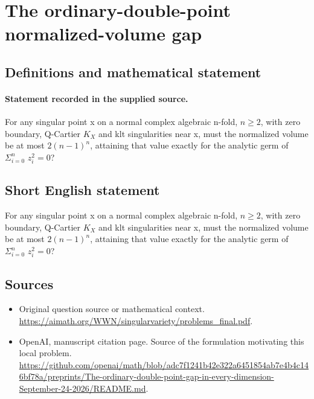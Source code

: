 \documentclass[11pt]{article}
\begin{document}
\section*{The ordinary-double-point normalized-volume gap}\label{statement}
\subsection{Definitions and mathematical statement}
\paragraph{Statement recorded in the supplied source.}
For any singular point x on a normal complex algebraic n-fold, $n\geq 2$, with zero boundary, Q-Cartier $K_X$ and klt singularities near x, must the normalized volume be at most $2(n-1)^n$, attaining that value exactly for the analytic germ of $\Sigma _{i=0}^n$ $z_i^{2}=0$?
\subsection{Short English statement}
For any singular point x on a normal complex algebraic n-fold, $n\geq 2$, with zero boundary, Q-Cartier $K_X$ and klt singularities near x, must the normalized volume be at most $2(n-1)^n$, attaining that value exactly for the analytic germ of $\Sigma _{i=0}^n$ $z_i^{2}=0$?
\subsection{Sources}
\begin{itemize}
\item[S1] Original question source or mathematical context.
\url{https://aimath.org/WWN/singularvariety/problems_final.pdf}.
\item[S2] OpenAI, manuscript citation page. Source of the formulation motivating this local problem.
\url{https://github.com/openai/math/blob/adc7f1241b42e322a6451854ab7e4b4c146bf78a/preprints/The-ordinary-double-point-gap-in-every-dimension-September-24-2026/README.md}.
\end{itemize}
\end{document}
